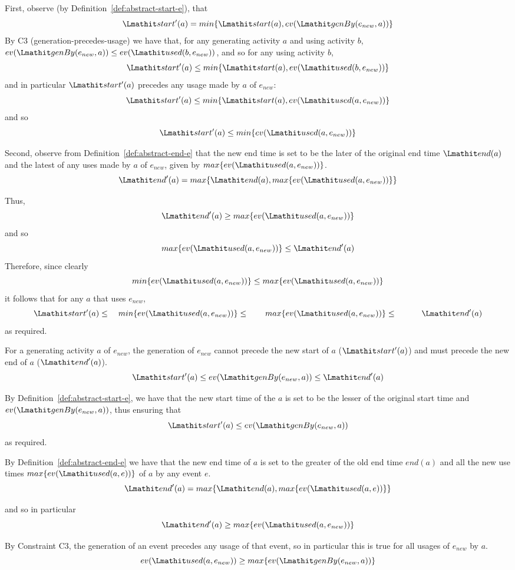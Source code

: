 First, observe (by Definition~\ref{def:abstract-start-e}), that
\[
\start'(a) = min\{\start(a),ev(\wgby(e_{new},a))\}
\]
By C3 (generation-precedes-usage) we have that, for any generating activity $a$ and using activity $b$,  $ev(\wgby(e_{new},a)) \leq ev(\used(b,e_{new}))$, and so for any using activity $b$, 
\[
\start'(a) \leq min\{\start(a),ev(\used(b,e_{new}))\}
\]
and in particular $\start'(a)$ precedes any usage made by $a$ of $e_{new}$:
\[
\start'(a) \leq min\{\start(a),ev(\used(a,e_{new}))\}
\]
and so
\[
\start'(a) \leq min\{ev(\used(a,e_{new}))\}
\]

Second, observe from Definition~\ref{def:abstract-end-e} that the new end time is set to be the later of the original end time $\ed(a)$ and the latest of any uses made by $a$ of $e_{new}$, given by $max\{ev(\used(a,e_{new}))\}$. 
\[
\ed'(a) = max\{\ed(a), max\{ev(\used(a,e_{new}))\}\}
\]

Thus, 
\[
\ed'(a) \geq  max\{ev(\used(a,e_{new}))\}
\]
and so
\[
max\{ev(\used(a,e_{new}))\} \leq \ed'(a)
\]
Therefore, since clearly 
\[
min\{ev(\used(a,e_{new}))\} \leq max\{ev(\used(a,e_{new}))\}
\]
 it follows that for any $a$ that uses $e_{new}$,
\[
\start'(a) \leq \\
\quad min\{ev(\used(a,e_{new}))\} \leq \\
\qquad max\{ev(\used(a,e_{new}))\} \leq \\
\quad \qquad \ed'(a)
\]
as required. 


For a generating activity $a$ of $e_{new}$, the generation of $e_{new}$ cannot precede the new start of $a$ ($\start'(a)$) and must precede the new end of $a$ ($\ed'(a)$).
\[
\start'(a) \leq ev(\wgby(e_{new},a)) \leq \ed'(a)
\]

By Definition~\ref{def:abstract-start-e}, we have that the new start time of the $a$ is set to be the lesser of the original start time and $ev(\wgby(e_{new},a))$, thus ensuring that
\[
\start'(a) \leq ev(\wgby(e_{new},a))
\]
as required.

By Definition~\ref{def:abstract-end-e} we have that the new end time of $a$ is set to the greater of the old end time $end(a)$ and all the new use times $max\{ev(\used(a,e))\}$ of $a$ by any event $e$. 
\[
\ed'(a) = max\{\ed(a), max\{ev(\used(a,e))\}\}
\]

and so in particular
\[
\ed'(a) \geq max\{ev(\used(a,e_{new}))\}
\]

By Constraint C3, the generation of an event precedes any usage of that event, so in particular this is true for all usages of $e_{new}$ by $a$. 
\[
 ev(\used(a,e_{new})) \geq max\{ev(\wgby(e_{new},a)) \}
\]

